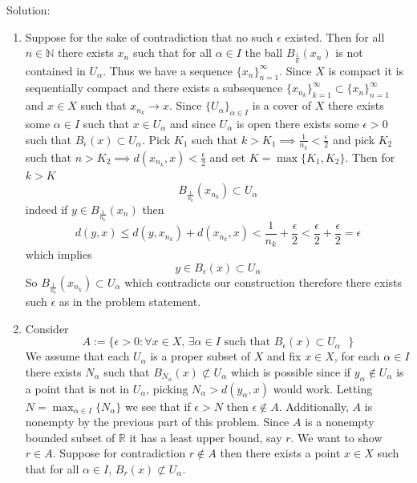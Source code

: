 \documentclass[11pt]{article}
\newcommand{\solution}[1]{{{\textcolor{header}{Solution:} \textcolor{solution}{#1}}}}
\begin{document}
\solution{
    \begin{enumerate}
        \item Suppose for the sake of contradiction that no such $\epsilon $ existed. Then for all $n \in \mathbb{N}$ there exists $x_n$ such that
            for all  $\alpha \in I$ the ball  $B_{\frac{1}{n}}(x_n)$ is not contained in $U_\alpha$. Thus we have a sequence $\{x_n\}_{n=1}^{\infty}$.
            Since $X$ is compact it is sequentially compact and there exists a subsequence 
            $\{x_{n_k}\}_{k=1}^{\infty} \subset \{x_n\}_{n=1}^{\infty}$ and $x \in X$ such that  $x_{n_k} \to x$.
            Since  $\{U_\alpha\}_{\alpha \in I}$  is a cover of $X$ there exists some $\alpha \in I$ such that $x \in U_\alpha$ and since $U_\alpha$
            is open there exists some $\epsilon > 0$ such that $B_\epsilon(x) \subset U_\alpha$.
            Pick $K_1$ such that $k > K_1 \implies \frac{1}{n_k} < \frac{\epsilon}{2}$ and pick $K_2 $ such that $n > K_2 \implies d(x_{n_k},x) < \frac{\epsilon}{2}$ and
            set $K = \max\{K_1,K_2\}$. Then for $k > K$
             \[
                 B_{\frac{1}{n_k}}(x_{n_k}) \subset U_\alpha
            \] 
            indeed if $y \in B_{\frac{1}{n_{k}}}(x_n)$ then
            \[
                d(y,x) \le d(y,x_{n_k}) + d(x_{n_k},x) < \frac{1}{n_k} + \frac{\epsilon}{2} < \frac{\epsilon}{2} + \frac{\epsilon}{2} = \epsilon
            \] 
            which implies
            \[
            y \in B_\epsilon(x) \subset U_\alpha
            \] 
            So $B_{\frac{1}{n_k}}(x_{n_k}) \subset U_\alpha$ which contradicts our construction therefore there exists such $\epsilon$ as in the problem statement.
        \item Consider
            \[
                A := \{\epsilon > 0: \text{$\forall x \in X$, $\exists \alpha \in I$ such that  $B_\epsilon(x) \subset U_\alpha$ }\}
            \] 
            We assume that each $U_\alpha$ is a proper subset of $X$ and fix  $x \in X$, for each  $\alpha \in I$ there exists $N_\alpha$ such that
            $B_{N_\alpha}(x) \not\subset U_\alpha$ which is possible since if  $y_\alpha \not\in U_\alpha$ is a point that is not in $U_\alpha$, picking $N_\alpha > d(y_\alpha,x)$ would work.
            Letting $N = \max_{\alpha \in I}\{N_\alpha\}$ we see that if $\epsilon > N$ then  $\epsilon \not\in A$. Additionally, $A$ is nonempty by 
            the previous part of this problem. Since  $A$ is a nonempty bounded subset of $ \mathbb{R}$ it  has a least upper bound, say $r$. We want to show $r \in A$.
            Suppose for contradiction  $r \not\in A$ then there exists a point $x \in X$ such that for all  $\alpha \in I$, $B_r(x) \not\subset U_\alpha$.

\end{enumerate}}
\end{document}
